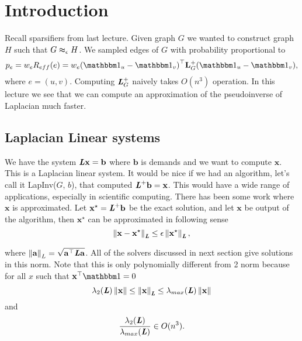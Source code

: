 \documentclass[11pt]{article}
\newcommand{\specApp}[3]{#1 \thickapprox_#2 #3}
\renewcommand{\tr}[1]{\ensuremath{{#1}}^{\top}}
\begin{document}
\newcommand{\coursenum}{{CSC 2421H}}
\newcommand{\coursename}{{Graphs, Matrices, and Optimization}}
\newcommand{\courseprof}{Sushant Sachdeva}


\section{Introduction}

Recall sparsifiers from last lecture. Given graph $G$ we wanted to construct graph $H$ such that $\specApp {G}{\eps}{H}$. We sampled edges of $G$  with probability proportional to
\[p_e = w_e R_{eff}(e) = w_e  {(\ones_u - \ones_v)}^{\top} \mathbf{L}_G^+ (\ones_u - \ones_v),\]
where $e = (u,v)$. Computing $\boldsymbol{\mathit{L}}_G^+$ naively takes $O(n^3)$ operation. In this lecture we see that we can compute an approximation of the pseudoinverse of Laplacian much faster.


\subsection{Laplacian Linear systems}
We have the system $\boldsymbol{\mathit{L}} \mathbf{x} = \mathbf{b}$ where $\mathbf{b}$ is demands and we want to compute $\mathbf{x}$. This is a Laplacian linear system. It would be nice if we had an algorithm, let's call it LapInv($G$, $b$), that computed $\boldsymbol{\mathit{L}}^+ \mathbf{b} = \mathbf{x}$. This would have a wide range of applications, especially in scientific computing. There has been some work where $\mathbf{x}$ is approximated. Let $\mathbf{x}^\star = \boldsymbol{\mathit{L}}^+ \mathbf{b}$ be the exact solution, and let $\mathbf{x}$ be output of the algorithm, then $\mathbf{x}^\star$ can be approximated in following sense
\[\left\lVert \mathbf{x} - \mathbf{x}^\star \right\rVert_{\boldsymbol{\mathit{L}}} \le \epsilon \left\lVert \mathbf{x}^\star \right\rVert_{\boldsymbol{\mathit{L}}}, \]

where $\norm {\mathbf{a}}_L = \sqrt {\tr {\mathbf{a}} \LL \mathbf{a}}$. All of the solvers discussed in next section give solutions in this norm.  Note that this is only polynomially different from 2 norm because for all $x$ such that $\tr {\mathbf{x}} \ones = 0$
\[\lambda_2 (\boldsymbol{\mathit{L}}) \left\lVert \mathbf{x} \right\rVert \le \left\lVert \mathbf{x} \right\rVert_{\boldsymbol{\mathit{L}}} \le \lambda_{max}(\boldsymbol{\mathit{L}}) \left\lVert \mathbf{x} \right\rVert\]
and 
\[\frac{\lambda_2 (\boldsymbol{\mathit{L}})}{\lambda_{max}(\boldsymbol{\mathit{L}})} \in O(n^3).
\]
\end{document}
